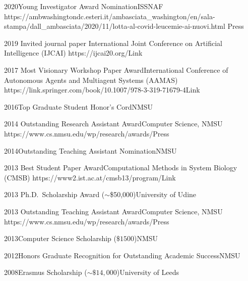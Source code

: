 \begin{awards}
\awardentry
  	{2020}{Young Investigator Award Nomination}{ISSNAF} 
	{https://ambwashingtondc.esteri.it/ambasciata\_washington/en/sala-stampa/dall\_ambasciata/2020/11/lotta-al-covid-leucemie-ai-nuovi.html}
	{Press}

	\awardentry
	{2019}
	{Invited journal paper}%
	{International Joint Conference on Artificial Intelligence (IJCAI)}
	{https://ijcai20.org/}{Link}

	\awardentry
	{2017}
	{Most Visionary Workshop Paper Award}{International Conference of 
	Autonomous Agents and Multiagent Systems (AAMAS)}
   {https://link.springer.com/book/10.1007/978-3-319-71679-4}{Link}

\awardentryN
{2016}{Top Graduate Student Honor's Cord}{NMSU}

\awardentry
	{2014}
	{Outstanding Research Assistant Award}{Computer Science, NMSU}
	{https://www.cs.nmsu.edu/wp/research/awards/}{Press}

\awardentryN
	{2014}{Outstanding Teaching Assistant Nomination}{NMSU}

	\awardentry
	{2013}
	{Best Student Paper Award}{Computational Methods in System Biology (CMSB)}
	{https://www2.ist.ac.at/cmsb13/program/}{Link}

\awardentryN
	{2013}
	{Ph.D.~Scholarship Award ($\sim$\$50,000)}{University of Udine}

\awardentry 
   {2013}
   {Outstanding Teaching Assistant Award}{Computer Science, NMSU}
   {https://www.cs.nmsu.edu/wp/research/awards/}{Press}

\awardentryN
{2013}{Computer Science Scholarship ($\$ 1500$)}{NMSU}

\awardentryN
{2012}{Honors Graduate Recognition for Outstanding Academic Success}{NMSU}

\awardentryN
{2008}{Erasmus Scholarship ($\sim \$ 14,000$)}{University of Leeds}

\end{awards}

